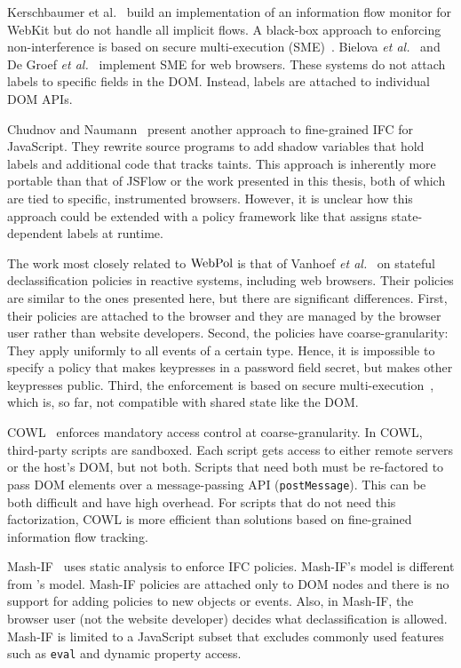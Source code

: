 Kerschbaumer et al.~\cite{crowdflow} build an implementation of an
information flow monitor for WebKit but do not handle all implicit
flows.  A black-box approach to enforcing non-interference is based on
secure multi-execution (SME)~\cite{SME}. Bielova \emph{et
  al.}~\cite{rnib} and De Groef \emph{et al.}~\cite{flowfox} implement
SME for web browsers. These systems do not attach labels to specific
fields in the DOM. Instead, labels are attached to individual DOM
APIs.

Chudnov and Naumann~\cite{chudnov-ccs} present another approach to
fine-grained IFC for JavaScript. They rewrite source programs to add
shadow variables that hold labels and additional code that tracks
taints. This approach is inherently more portable than that of JSFlow
or the work presented in this thesis, both of which are tied to
specific, instrumented browsers. However, it is unclear how this
approach could be extended with a policy framework like {\sys} that
assigns state-dependent labels at runtime.

The work most closely related to $\mbox{WebPol}$ is that of
Vanhoef \emph{et al.}~\cite{csf14} on stateful declassification
policies in reactive systems, including web browsers. Their policies
are similar to the ones presented here, but there are significant
differences. First, 
their policies are attached to the browser and they are managed by the
browser user rather than website developers. Second, the policies have 
coarse-granularity: They apply uniformly to all events of a certain
type. Hence, it is impossible to specify a policy that makes
keypresses in a password field secret, but makes other keypresses
public. Third, the enforcement is based on secure
multi-execution~\cite{SME}, which is, so far, not compatible with
shared state like the DOM.

COWL~\cite{cowl} enforces mandatory access control at
coarse-granularity. In COWL, third-party scripts are sandboxed. Each
script gets access to either remote servers or the host's DOM, but not
both. Scripts that need both must be re-factored to pass DOM elements
over a message-passing API (\texttt{postMessage}). This can be both
difficult and have high overhead. For scripts that do not need this
factorization, COWL is more efficient than solutions based on 
fine-grained information flow tracking.

Mash-IF~\cite{mashif} uses static analysis to enforce IFC
policies. Mash-IF's model is different from {\sys}'s model. Mash-IF
policies are attached only to DOM nodes and there is no support for
adding policies to new objects or events. Also, in Mash-IF, the
browser user (not the website developer) decides what
declassification is allowed. Mash-IF is limited to a JavaScript
subset that excludes commonly used features such as \texttt{eval} and
dynamic property access.

